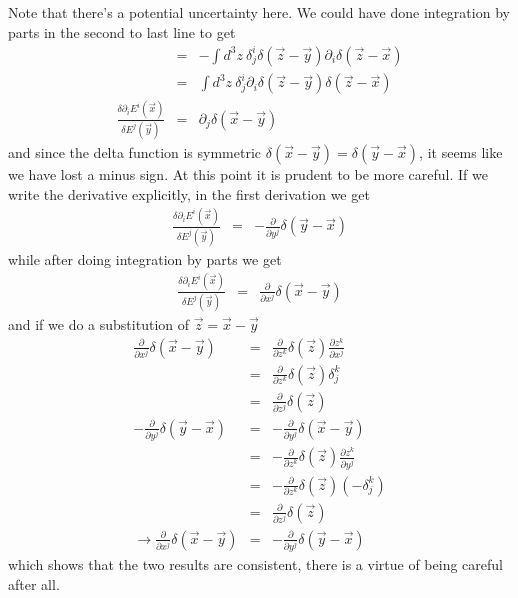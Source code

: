 \documentclass[aps,preprint,preprintnumbers,nofootinbib,showpacs,prd]{revtex4-1}
\newcommand{\nbea}{\begin{eqnarray*}}
\newcommand{\neea}{\end{eqnarray*}}
\begin{document}
Note that there's a potential uncertainty here. We could have done integration by parts in the second to last line to get 
%
\nbea
& = & -\int d^3z~ \delta^i_j \delta (\vec z-\vec y) \partial_i \delta(\vec z-\vec x) \\
& = & \int d^3z~ \delta^i_j \partial_i \delta (\vec z-\vec y) \delta(\vec z-\vec x) \\
\frac{\delta \partial_i E^i(\vec x)}{\delta E^j(\vec y)} & = & \partial_j \delta (\vec x-\vec y) 
\neea
%
and since the delta function is symmetric $\delta(\vec x-\vec y) = \delta(\vec y-\vec x)$, it seems like we have lost a minus sign. At this point it is prudent to be more careful. If we write the derivative explicitly, in the first derivation we get
%
\nbea
\frac{\delta \partial_i E^i(\vec x)}{\delta E^j(\vec y)} & = & -\frac{\partial}{\partial y^j} \delta (\vec y-\vec x) 
\neea
%
while after doing integration by parts we get
%
\nbea
\frac{\delta \partial_i E^i(\vec x)}{\delta E^j(\vec y)} & = & \frac{\partial}{\partial x^j} \delta (\vec x-\vec y) 
\neea
%
and if we do a substitution of $\vec z = \vec x - \vec y$
%
\nbea
\frac{\partial}{\partial x^j} \delta (\vec x-\vec y) & = & \frac{\partial}{\partial z^k} \delta (\vec z) \frac{\partial z^k}{\partial x^j} \\
& = & \frac{\partial}{\partial z^k} \delta (\vec z) \delta^k_j \\
& = & \frac{\partial}{\partial z^j} \delta (\vec z) \\
-\frac{\partial}{\partial y^j} \delta (\vec y-\vec x) & = & -\frac{\partial}{\partial y^j} \delta (\vec x-\vec y) \\
& = & -\frac{\partial}{\partial z^k} \delta (\vec z) \frac{\partial z^k}{\partial y^j} \\
& = & -\frac{\partial}{\partial z^k} \delta (\vec z) (-\delta^k_j) \\
& = & \frac{\partial}{\partial z^j} \delta (\vec z) \\
\to \frac{\partial}{\partial x^j} \delta (\vec x-\vec y) & = & -\frac{\partial}{\partial y^j} \delta (\vec y-\vec x) 
\neea
%
which shows that the two results are consistent, there is a virtue of being careful after all.
\end{document}
